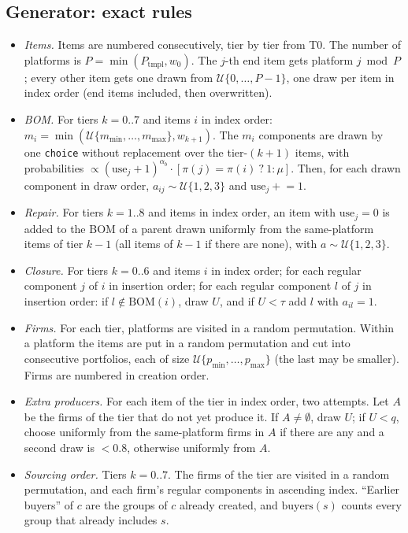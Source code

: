 \documentclass{ifacconf}
\begin{document}
\subsection{Generator: exact rules}
\label{app:gen}
\begin{itemize}
\item \emph{Items.} Items are numbered consecutively, tier by tier from T0. The number of platforms is $P=\min(P_{\mathrm{tmpl}},w_0)$. The $j$-th end item gets platform $j\bmod P$; every other item gets one drawn from $\mathcal{U}\{0,\dots,P-1\}$, one draw per item in index order (end items included, then overwritten).
\item \emph{BOM.} For tiers $k=0..7$ and items $i$ in index order: $m_i=\min(\mathcal{U}\{m_{\min},\dots,m_{\max}\},w_{k+1})$. The $m_i$ components are drawn by one \texttt{choice} without replacement over the tier-$(k{+}1)$ items, with probabilities $\propto(\mathrm{use}_j+1)^{\alpha_b}\cdot[\pi(j){=}\pi(i)\ ?\ 1:\mu]$. Then, for each drawn component in draw order, $a_{ij}\sim\mathcal{U}\{1,2,3\}$ and $\mathrm{use}_j\mathrel{+}=1$.
\item \emph{Repair.} For tiers $k=1..8$ and items in index order, an item with $\mathrm{use}_j=0$ is added to the BOM of a parent drawn uniformly from the same-platform items of tier $k-1$ (all items of $k-1$ if there are none), with $a\sim\mathcal{U}\{1,2,3\}$.
\item \emph{Closure.} For tiers $k=0..6$ and items $i$ in index order; for each regular component $j$ of $i$ in insertion order; for each regular component $l$ of $j$ in insertion order: if $l\notin\mathrm{BOM}(i)$, draw $U$, and if $U<\tau$ add $l$ with $a_{il}=1$.
\item \emph{Firms.} For each tier, platforms are visited in a random permutation. Within a platform the items are put in a random permutation and cut into consecutive portfolios, each of size $\mathcal{U}\{p_{\min},\dots,p_{\max}\}$ (the last may be smaller). Firms are numbered in creation order.
\item \emph{Extra producers.} For each item of the tier in index order, two attempts. Let $A$ be the firms of the tier that do not yet produce it. If $A\neq\emptyset$, draw $U$; if $U<q$, choose uniformly from the same-platform firms in $A$ if there are any and a second draw is $<0.8$, otherwise uniformly from $A$.
\item \emph{Sourcing order.} Tiers $k=0..7$. The firms of the tier are visited in a random permutation, and each firm's regular components in ascending index. ``Earlier buyers'' of $c$ are the groups of $c$ already created, and $\mathrm{buyers}(s)$ counts every group that already includes $s$.

\end{itemize}
\end{document}
